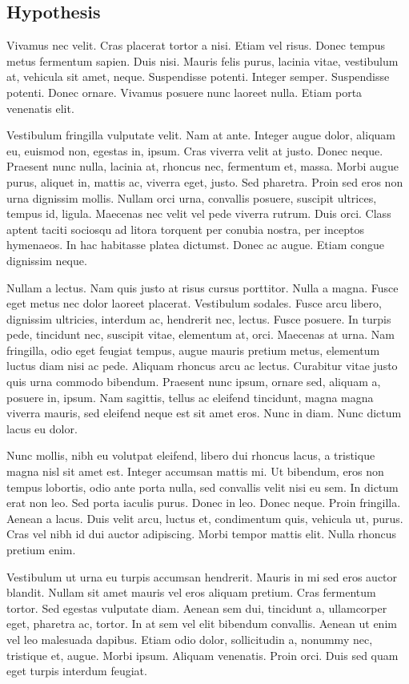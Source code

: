 \subsection{Hypothesis}  

Vivamus nec velit. Cras placerat tortor a nisi. Etiam vel risus. Donec tempus metus fermentum sapien. Duis nisi. Mauris felis purus, lacinia vitae, vestibulum at, vehicula sit amet, neque. Suspendisse potenti. Integer semper. Suspendisse potenti. Donec ornare. Vivamus posuere nunc laoreet nulla. Etiam porta venenatis elit.

Vestibulum fringilla vulputate velit. Nam at ante. Integer augue dolor, aliquam eu, euismod non, egestas in, ipsum. Cras viverra velit at justo. Donec neque. Praesent nunc nulla, lacinia at, rhoncus nec, fermentum et, massa. Morbi augue purus, aliquet in, mattis ac, viverra eget, justo. Sed pharetra. Proin sed eros non urna dignissim mollis. Nullam orci urna, convallis posuere, suscipit ultrices, tempus id, ligula. Maecenas nec velit vel pede viverra rutrum. Duis orci. Class aptent taciti sociosqu ad litora torquent per conubia nostra, per inceptos hymenaeos. In hac habitasse platea dictumst. Donec ac augue. Etiam congue dignissim neque.

Nullam a lectus. Nam quis justo at risus cursus porttitor. Nulla a magna. Fusce eget metus nec dolor laoreet placerat. Vestibulum sodales. Fusce arcu libero, dignissim ultricies, interdum ac, hendrerit nec, lectus. Fusce posuere. In turpis pede, tincidunt nec, suscipit vitae, elementum at, orci. Maecenas at urna. Nam fringilla, odio eget feugiat tempus, augue mauris pretium metus, elementum luctus diam nisi ac pede. Aliquam rhoncus arcu ac lectus. Curabitur vitae justo quis urna commodo bibendum. Praesent nunc ipsum, ornare sed, aliquam a, posuere in, ipsum. Nam sagittis, tellus ac eleifend tincidunt, magna magna viverra mauris, sed eleifend neque est sit amet eros. Nunc in diam. Nunc dictum lacus eu dolor.

Nunc mollis, nibh eu volutpat eleifend, libero dui rhoncus lacus, a tristique magna nisl sit amet est. Integer accumsan mattis mi. Ut bibendum, eros non tempus lobortis, odio ante porta nulla, sed convallis velit nisi eu sem. In dictum erat non leo. Sed porta iaculis purus. Donec in leo. Donec neque. Proin fringilla. Aenean a lacus. Duis velit arcu, luctus et, condimentum quis, vehicula ut, purus. Cras vel nibh id dui auctor adipiscing. Morbi tempor mattis elit. Nulla rhoncus pretium enim.

Vestibulum ut urna eu turpis accumsan hendrerit. Mauris in mi sed eros auctor blandit. Nullam sit amet mauris vel eros aliquam pretium. Cras fermentum tortor. Sed egestas vulputate diam. Aenean sem dui, tincidunt a, ullamcorper eget, pharetra ac, tortor. In at sem vel elit bibendum convallis. Aenean ut enim vel leo malesuada dapibus. Etiam odio dolor, sollicitudin a, nonummy nec, tristique et, augue. Morbi ipsum. Aliquam venenatis. Proin orci. Duis sed quam eget turpis interdum feugiat.

